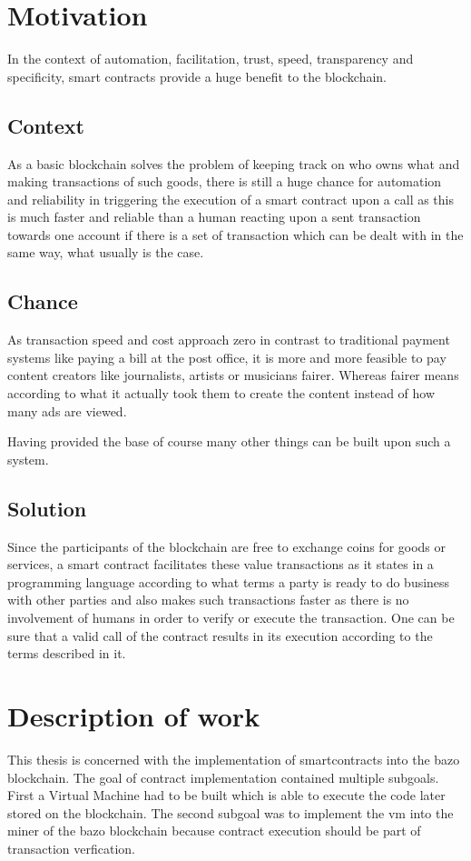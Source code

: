 \section{Motivation}
In the context of automation, facilitation, trust, speed, transparency and specificity, smart contracts provide a huge benefit to the blockchain.

\subsection{Context}
As a basic blockchain solves the problem of keeping track on who owns what and making transactions of such goods, there is still a huge chance for automation and reliability in triggering the execution of a smart contract upon a call as this is much faster and reliable than a human reacting upon a sent transaction towards one account if there is a set of transaction which can be dealt with in the same way, what usually is the case. 

\subsection{Chance}
As transaction speed and cost approach zero in contrast to traditional payment systems like paying a bill at the post office, it is more and more feasible to pay content creators like journalists, artists or musicians fairer. Whereas fairer means according to what it actually took them to create the content instead of how many ads are viewed.

Having provided the base of course many other things can be built upon such a system.

\subsection{Solution}
Since the participants of the blockchain are free to exchange coins for goods or services, a smart contract facilitates these value transactions as it states in a programming language according to what terms a party is ready to do business with other parties and also makes such transactions faster as there is no involvement of humans in order to verify or execute the transaction. One can be sure that a valid call of the contract results in its execution according to the terms described in it.

\section{Description of work}
This thesis is concerned with the implementation of smartcontracts into the bazo blockchain. The goal of contract implementation contained multiple subgoals. First a Virtual Machine had to be built which is able to execute the code later stored on the blockchain. The second subgoal was to implement the vm into the miner of the bazo blockchain because contract execution should be part of transaction verfication.
